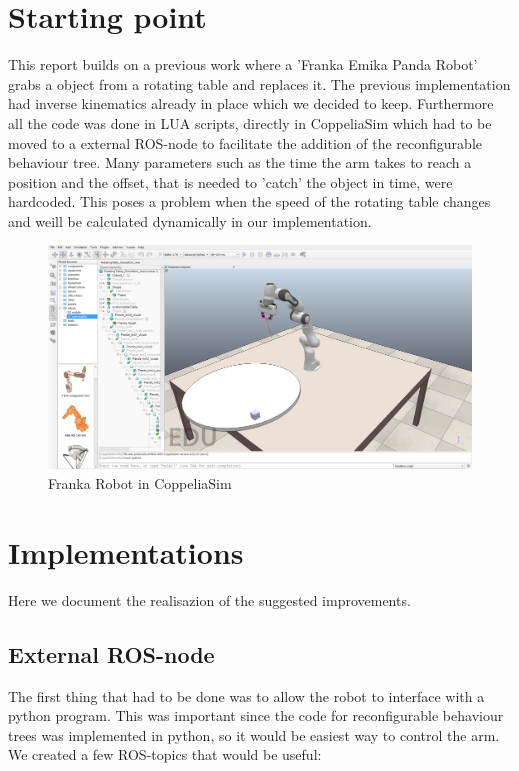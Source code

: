 \documentclass[report]{iisthesis}
\begin{document}
\chapter{Starting point}
This report builds on a previous work where a 'Franka Emika Panda Robot' grabs a object from a rotating table and replaces it.
The previous implementation had inverse kinematics already in place which we decided to keep. Furthermore all the code was done in LUA scripts, directly in CoppeliaSim which had to be moved to a external ROS-node to facilitate the addition of the reconfigurable behaviour tree.
Many parameters such as the time the arm takes to reach a position and the offset, that is needed to 'catch' the object in time, were hardcoded. This poses a problem when the speed of the rotating table changes and weill be calculated dynamically in our implementation.

\begin{figure}[h]
    \caption{Franka Robot in CoppeliaSim}
    \includegraphics[width=\textwidth]{arm_coppeliaSim}
\end{figure}

\chapter{Implementations}
Here we document the realisazion of the suggested improvements.
\section{External ROS-node}
The first thing that had to be done was to allow the robot to interface with a python program.
This was important since the code for reconfigurable behaviour trees was implemented in python, so it would be easiest way to control the 
arm.
We created a few ROS-topics that would be useful:
\end{document}
